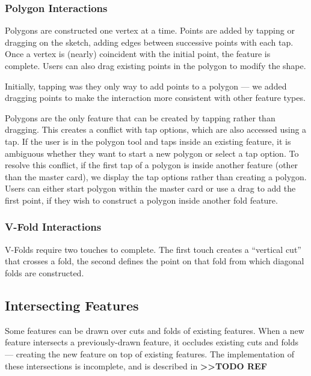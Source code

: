 \subsubsection{Polygon Interactions}\label{polygon-interactions}

Polygons are constructed one vertex at a time. Points are added by
tapping or dragging on the sketch, adding edges between successive
points with each tap. Once a vertex is (nearly) coincident with the
initial point, the feature is complete. Users can also drag existing
points in the polygon to modify the shape.

Initially, tapping was they only way to add points to a polygon --- we
added dragging points to make the interaction more consistent with other
feature types.

Polygons are the only feature that can be created by tapping rather than
dragging. This creates a conflict with tap options, which are also
accessed using a tap. If the user is in the polygon tool and taps inside
an existing feature, it is ambiguous whether they want to start a new
polygon or select a tap option. To resolve this conflict, if the first
tap of a polygon is inside another feature (other than the master card),
we display the tap options rather than creating a polygon. Users can
either start polygon within the master card or use a drag to add the
first point, if they wish to construct a polygon inside another fold
feature.

\subsubsection{V-Fold Interactions}\label{v-fold-interactions}

V-Folds require two touches to complete. The first touch creates a
``vertical cut'' that crosses a fold, the second defines the point on
that fold from which diagonal folds are constructed.

\subsection{Intersecting Features}\label{intersecting-features}

Some features can be drawn over cuts and folds of existing features.
When a new feature intersects a previously-drawn feature, it occludes
existing cuts and folds --- creating the new feature on top of existing
features. The implementation of these intersections is incomplete, and
is described in \textbf{\textgreater{}\textgreater{}TODO REF}

